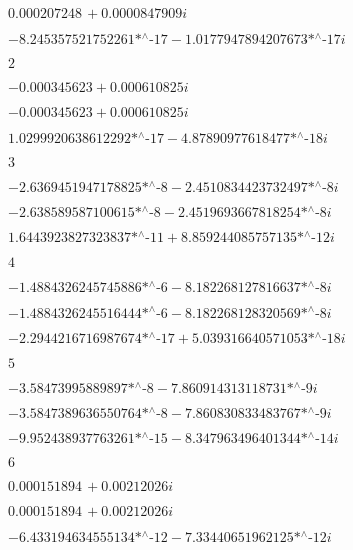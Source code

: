 \noindent\(0.000207248\, +0.0000847909 i\)

\noindent\(-\text{8.245357521752261$\grave{ }$*${}^{\wedge}$-17}-\text{1.0177947894207673$\grave{ }$*${}^{\wedge}$-17} i\)

\noindent\(2\)

\noindent\(-0.000345623+0.000610825 i\)

\noindent\(-0.000345623+0.000610825 i\)

\noindent\(\text{1.0299920638612292$\grave{ }$*${}^{\wedge}$-17}-\text{4.87890977618477$\grave{ }$*${}^{\wedge}$-18} i\)

\noindent\(3\)

\noindent\(-\text{2.6369451947178825$\grave{ }$*${}^{\wedge}$-8}-\text{2.4510834423732497$\grave{ }$*${}^{\wedge}$-8} i\)

\noindent\(-\text{2.638589587100615$\grave{ }$*${}^{\wedge}$-8}-\text{2.4519693667818254$\grave{ }$*${}^{\wedge}$-8} i\)

\noindent\(\text{1.6443923827323837$\grave{ }$*${}^{\wedge}$-11}+\text{8.859244085757135$\grave{ }$*${}^{\wedge}$-12} i\)

\noindent\(4\)

\noindent\(-\text{1.4884326245745886$\grave{ }$*${}^{\wedge}$-6}-\text{8.182268127816637$\grave{ }$*${}^{\wedge}$-8} i\)

\noindent\(-\text{1.4884326245516444$\grave{ }$*${}^{\wedge}$-6}-\text{8.182268128320569$\grave{ }$*${}^{\wedge}$-8} i\)

\noindent\(-\text{2.2944216716987674$\grave{ }$*${}^{\wedge}$-17}+\text{5.039316640571053$\grave{ }$*${}^{\wedge}$-18} i\)

\noindent\(5\)

\noindent\(-\text{3.58473995889897$\grave{ }$*${}^{\wedge}$-8}-\text{7.860914313118731$\grave{ }$*${}^{\wedge}$-9} i\)

\noindent\(-\text{3.5847389636550764$\grave{ }$*${}^{\wedge}$-8}-\text{7.860830833483767$\grave{ }$*${}^{\wedge}$-9} i\)

\noindent\(-\text{9.952438937763261$\grave{ }$*${}^{\wedge}$-15}-\text{8.347963496401344$\grave{ }$*${}^{\wedge}$-14} i\)

\noindent\(6\)

\noindent\(0.000151894\, +0.00212026 i\)

\noindent\(0.000151894\, +0.00212026 i\)

\noindent\(-\text{6.433194634555134$\grave{ }$*${}^{\wedge}$-12}-\text{7.33440651962125$\grave{ }$*${}^{\wedge}$-12} i\)

